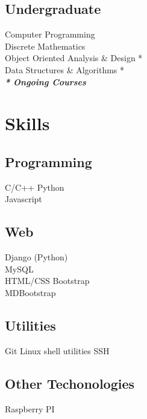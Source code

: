\documentclass[]{deedy-resume-openfont}
\begin{document}
\begin{minipage}[t]{0.30\textwidth}

\subsection{Undergraduate}
Computer Programming \\
Discrete Mathematics \\
Object Oriented Analysis \& Design * \\
Data Structures \& Algorithms * \\
{\footnotesize \textit{\textbf{* Ongoing Courses}}}
\sectionsep


\section{Skills}
\subsection{Programming}
\textbullet{}   C/C++  \textbullet{} Python \\
\textbullet{} Javascript 
\sectionsep

\subsection{Web}
\textbullet{} Django (Python) \\ \textbullet{} MySQL \\ 
\textbullet{} HTML/CSS \textbullet{} Bootstrap \\ 
\textbullet{} MDBootstrap \\
\sectionsep

\subsection{Utilities}
 \textbullet{} Git \textbullet{} Linux shell utilities \textbullet{} SSH
\sectionsep
\subsection{Other Techonologies}
 \textbullet{} Raspberry PI \\
\bigskip


\end{minipage}
\end{document}
